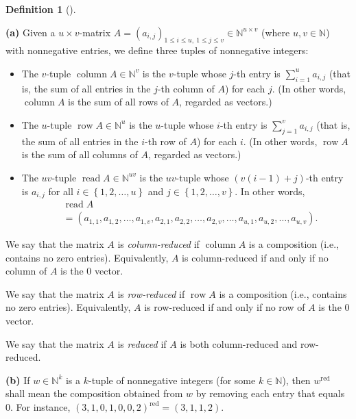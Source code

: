 \documentclass[numbers=enddot,12pt,final,onecolumn,notitlepage,abstracton]{scrartcl}%
\theoremstyle{definition}
\newtheorem{defi}[theo]{Definition}
\newenvironment{definition}[1][]
{\begin{defi}[#1]\begin{leftbar}}
{\end{leftbar}\end{defi}}
\let\sumnonlimits\sum
\renewcommand{\sum}{\sumnonlimits\limits}
\begin{document}
\begin{definition}
\label{def.QSym.secondcomult}\textbf{(a)} Given a $u\times v$-matrix
$A=\left(  a_{i,j}\right)  _{1\leq i\leq u,\ 1\leq j\leq v}\in\mathbb{N}%
^{u\times v}$ (where $u,v\in\mathbb{N}$) with nonnegative entries, we define
three tuples of nonnegative integers:

\begin{itemize}
\item The $v$-tuple $\operatorname*{column}A\in\mathbb{N}^{v}$ is the
$v$-tuple whose $j$-th entry is $\sum_{i=1}^{u}a_{i,j}$ (that is, the sum of
all entries in the $j$-th column of $A$) for each $j$. (In other words,
$\operatorname*{column}A$ is the sum of all rows of $A$, regarded as vectors.)

\item The $u$-tuple $\operatorname*{row}A\in\mathbb{N}^{u}$ is the $u$-tuple
whose $i$-th entry is $\sum_{j=1}^{v}a_{i,j}$ (that is, the sum of all entries
in the $i$-th row of $A$) for each $i$. (In other words, $\operatorname{row}A$
is the sum of all columns of $A$, regarded as vectors.)

\item The $uv$-tuple $\operatorname*{read}A\in\mathbb{N}^{uv}$ is the
$uv$-tuple whose $\left(  v\left(  i-1\right)  +j\right)  $-th entry is
$a_{i,j}$ for all $i\in\left\{  1,2,\ldots,u\right\}  $ and $j\in\left\{
1,2,\ldots,v\right\}  $. In other words,%
\begin{align*}
&  \operatorname*{read}A\\
&  =\left(  a_{1,1},a_{1,2},\ldots,a_{1,v},a_{2,1},a_{2,2},\ldots
,a_{2,v},\ldots,a_{u,1},a_{u,2},\ldots,a_{u,v}\right)  .
\end{align*}

\end{itemize}

We say that the matrix $A$ is \textit{column-reduced} if
$\operatorname*{column}A$ is a composition (i.e., contains no zero entries).
Equivalently, $A$ is column-reduced if and only if no column of $A$ is the $0$ vector.

We say that the matrix $A$ is \textit{row-reduced} if $\operatorname*{row}A$
is a composition (i.e., contains no zero entries). Equivalently, $A$ is
row-reduced if and only if no row of $A$ is the $0$ vector.

We say that the matrix $A$ is \textit{reduced} if $A$ is both column-reduced
and row-reduced.

\textbf{(b)} If $w\in\mathbb{N}^{k}$ is a $k$-tuple of nonnegative integers
(for some $k\in\mathbb{N}$), then $w^{\operatorname*{red}}$ shall mean the
composition obtained from $w$ by removing each entry that equals $0$. For
instance, $\left(  3,1,0,1,0,0,2\right)  ^{\operatorname*{red}}=\left(
3,1,1,2\right)  $.


\end{definition}
\end{document}
